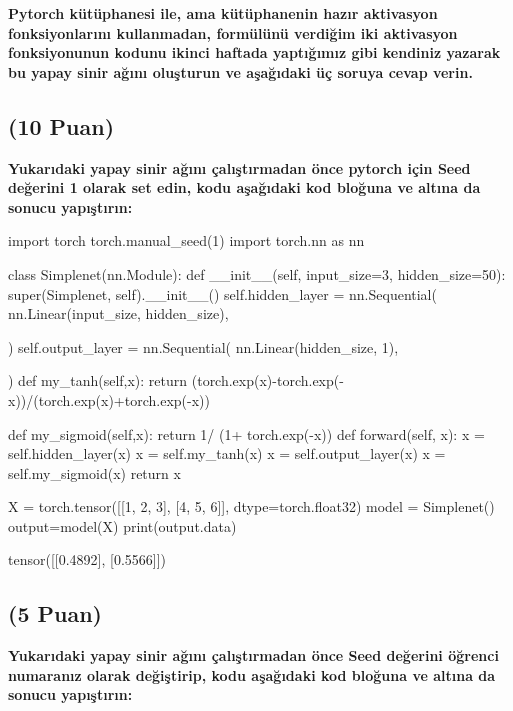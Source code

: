 \documentclass[11pt]{article}
\begin{document}
\vspace{.2in}
 \textbf{Pytorch kütüphanesi ile, ama kütüphanenin hazır aktivasyon fonksiyonlarını kullanmadan, formülünü verdiğim iki aktivasyon fonksiyonunun kodunu ikinci haftada yaptığımız gibi kendiniz yazarak bu yapay sinir ağını oluşturun ve aşağıdaki üç soruya cevap verin.}
 
\subsection{(10 Puan)} \textbf{Yukarıdaki yapay sinir ağını çalıştırmadan önce pytorch için Seed değerini 1 olarak set edin, kodu aşağıdaki kod bloğuna ve altına da sonucu yapıştırın:}

\begin{python}
import torch
torch.manual_seed(1)
import torch.nn as nn

class Simplenet(nn.Module):
    def __init__(self, input_size=3, hidden_size=50):
        super(Simplenet, self).__init__()
        self.hidden_layer = nn.Sequential(
            nn.Linear(input_size, hidden_size),
            
        )
        self.output_layer = nn.Sequential(
            nn.Linear(hidden_size, 1),
            
        )
    def my_tanh(self,x):
      return (torch.exp(x)-torch.exp(-x))/(torch.exp(x)+torch.exp(-x))

    def my_sigmoid(self,x):
      return 1/ (1+ torch.exp(-x))    
    def forward(self, x):
        x = self.hidden_layer(x)
        x = self.my_tanh(x)
        x = self.output_layer(x)
        x = self.my_sigmoid(x)
        return x

X = torch.tensor([[1, 2, 3], [4, 5, 6]], dtype=torch.float32)
model = Simplenet()
output=model(X)
print(output.data)
\end{python}

tensor([[0.4892],
        [0.5566]])

\subsection{(5 Puan)} \textbf{Yukarıdaki yapay sinir ağını çalıştırmadan önce Seed değerini öğrenci numaranız olarak değiştirip, kodu aşağıdaki kod bloğuna ve altına da sonucu yapıştırın:}
\end{document}

